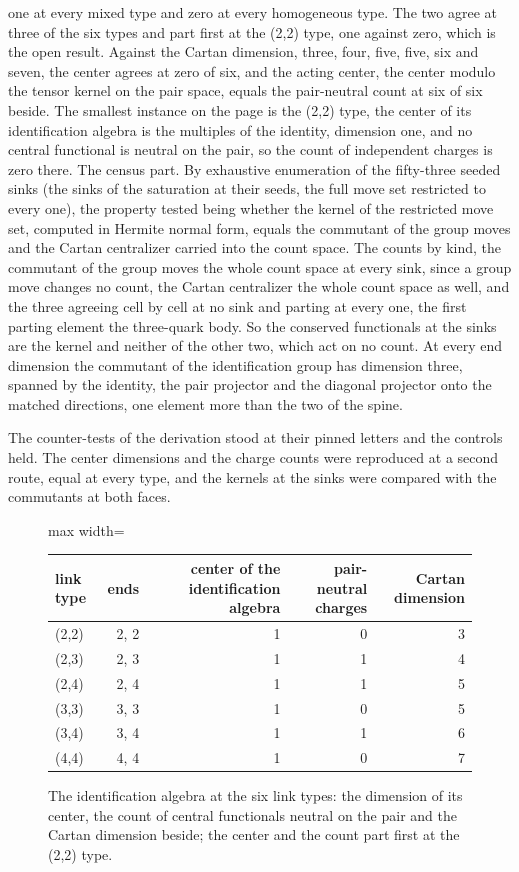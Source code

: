 \begin{chproof}
one at every mixed type and zero at every homogeneous type. The two agree at three of the six types and part first at the (2,2) type, one against zero, which is the open result. Against the Cartan dimension, three, four, five, five, six and seven, the center agrees at zero of six, and the acting center, the center modulo the tensor kernel on the pair space, equals the pair-neutral count at six of six beside. The smallest instance on the page is the (2,2) type, the center of its identification algebra is the multiples of the identity, dimension one, and no central functional is neutral on the pair, so the count of independent charges is zero there. The census part. By exhaustive enumeration of the fifty-three seeded sinks (the sinks of the saturation at their seeds, the full move set restricted to every one), the property tested being whether the kernel of the restricted move set, computed in Hermite normal form, equals the commutant of the group moves and the Cartan centralizer carried into the count space. The counts by kind, the commutant of the group moves the whole count space at every sink, since a group move changes no count, the Cartan centralizer the whole count space as well, and the three agreeing cell by cell at no sink and parting at every one, the first parting element the three-quark body. So the conserved functionals at the sinks are the kernel and neither of the other two, which act on no count. At every end dimension the commutant of the identification group has dimension three, spanned by the identity, the pair projector and the diagonal projector onto the matched directions, one element more than the two of the spine.

The counter-tests of the derivation stood at their pinned letters and the controls held. The center dimensions and the charge counts were reproduced at a second route, equal at every type, and the kernels at the sinks were compared with the commutants at both faces.
\end{chproof}
\begin{figure}[h]\centering
\begin{adjustbox}{max width=\linewidth}\begin{tabular}{lrrrr}\toprule
link type & ends & center of the identification algebra & pair-neutral charges & Cartan dimension \\ \midrule
(2,2) & 2, 2 & 1 & 0 & 3 \\
(2,3) & 2, 3 & 1 & 1 & 4 \\
(2,4) & 2, 4 & 1 & 1 & 5 \\
(3,3) & 3, 3 & 1 & 0 & 5 \\
(3,4) & 3, 4 & 1 & 1 & 6 \\
(4,4) & 4, 4 & 1 & 0 & 7 \\ \bottomrule
\end{tabular}\end{adjustbox}
\caption{The identification algebra at the six link types: the dimension of its center, the count of central functionals neutral on the pair and the Cartan dimension beside; the center and the count part first at the (2,2) type.}
\end{figure}
